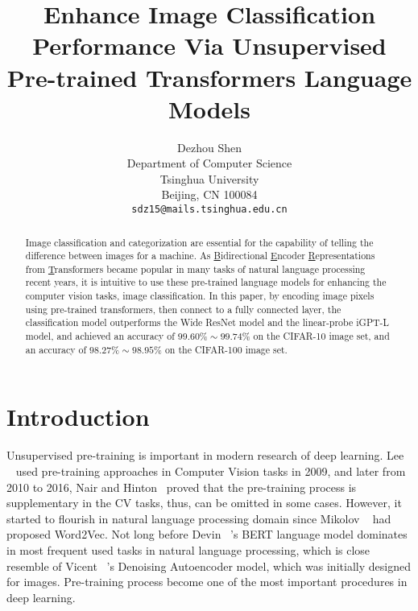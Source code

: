 \documentclass[review]{cvpr}
\begin{document}
\title{Enhance Image Classification Performance Via Unsupervised Pre-trained Transformers Language Models}

\author{Dezhou Shen\\
Department of Computer Science\\
Tsinghua University\\
Beijing, CN 100084\\
{\tt\small sdz15@mails.tsinghua.edu.cn}
}

\maketitle


\begin{abstract}

  Image classification and categorization are essential for the capability of telling the difference between images for a machine.
  As \underline{B}idirectional \underline{E}ncoder \underline{R}epresentations from \underline{T}ransformers became popular in many tasks of natural language processing recent years,
  it is intuitive to use these pre-trained language models for enhancing the computer vision tasks, \eg image classification.
  In this paper, by encoding image pixels using pre-trained transformers, then connect to a fully connected layer,
  the classification model outperforms the Wide ResNet model and the linear-probe iGPT-L model,
  and achieved an accuracy of $99.60\%\sim99.74\%$ on the CIFAR-10 image set, and an accuracy of $98.27\%\sim98.95\%$ on the CIFAR-100 image set.

\end{abstract}

\section{Introduction}

  Unsupervised pre-training is important in modern research of deep learning.
  Lee \etal~\cite{lee2009convolutional} used pre-training approaches
  in Computer Vision tasks in 2009, and later from 2010 to 2016, Nair and Hinton~\cite{nair2010rectified} proved that the pre-training process is supplementary in the CV tasks,
  thus, can be omitted in some cases.
  However, it started to flourish in natural language processing domain since Mikolov \etal~\cite{mikolov2013distributed} had proposed Word2Vec.
  Not long before Devin \etal~\cite{devlin2019bert}'s BERT language model dominates in most frequent used tasks in natural language processing,
  which is close resemble of Vicent \etal~\cite{vincent2008extracting}'s Denoising Autoencoder model, which was initially designed for images.
  Pre-training process become one of the most important procedures in deep learning.
\end{document}
